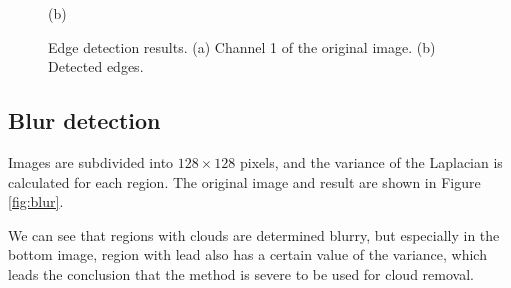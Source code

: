 \documentclass{article}
\begin{document}
\begin{figure}[h]
\begin{minipage}{0.49\hsize}
                \caption*{(b)}
            \end{minipage}
            \caption{
                Edge detection results.
                (a) Channel 1 of the original image.
                (b) Detected edges.
            }
            \label{fig:edge}
        \end{figure}

    \subsection{Blur detection}
        Images are subdivided into $128 \times 128$ pixels,
        and the variance of the Laplacian is calculated for each region.
        The original image and result are shown in Figure \ref{fig:blur}.

        We can see that regions with clouds are determined blurry,
        but especially in the bottom image,
        region with lead also has a certain value of the variance,
        which leads the conclusion that the method is severe to be used for cloud removal.
\end{document}
